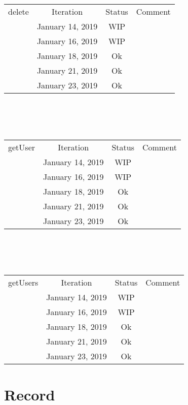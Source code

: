 \documentclass{scrreprt}
\begin{document}
	\\ \\ \\
	\begin{tabularx}{12cm}{X|c|c|c}
		delete & Iteration & Status & Comment  \\
		& January 14, 2019 & WIP & \\
		& January 16, 2019 & WIP & \\
		& January 18, 2019 & Ok & \\
		& January 21, 2019 & Ok & \\
		& January 23, 2019 & Ok & \\
	\end{tabularx}	
	\\ \\ \\
	\begin{tabularx}{12cm}{X|c|c|c}
		getUser & Iteration & Status & Comment  \\
		& January 14, 2019 & WIP & \\
		& January 16, 2019 & WIP & \\
		& January 18, 2019 & Ok & \\
		& January 21, 2019 & Ok & \\
		& January 23, 2019 & Ok & \\
	\end{tabularx}	
	\\ \\ \\
	\begin{tabularx}{12cm}{X|c|c|c}
		getUsers & Iteration & Status & Comment  \\
		& January 14, 2019 & WIP & \\
		& January 16, 2019 & WIP & \\
		& January 18, 2019 & Ok & \\
		& January 21, 2019 & Ok & \\
		& January 23, 2019 & Ok & \\
	\end{tabularx}	

\section{Record}
\end{document}

